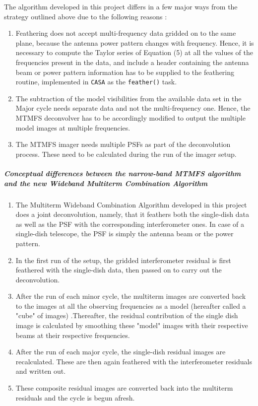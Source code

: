 \documentclass{article}
\begin{document}
The algorithm developed in this project differs in a few major ways from the strategy outlined above due to the following reasons : 
\begin{enumerate}
\item Feathering does not accept multi-frequency data gridded on to the same plane, because the antenna power pattern changes with frequency. Hence, it is necessary to compute the Taylor series of Equation (5) at all the values of the frequencies present in the data, and include a header containing the antenna beam or power pattern information has to be supplied to the feathering routine, implemented in \texttt{CASA} as the \texttt{feather()} task. 
\item The subtraction of the model visibilities from the available data set in the Major cycle needs separate data and not the multi-frequency one. Hence, the MTMFS deconvolver has to be accordingly modified to output the multiple model images at multiple frequencies. 
\item The MTMFS imager needs multiple PSFs as part of the deconvolution process. These need to be calculated during the run of the imager setup. 
\end{enumerate}
\subparagraph{Conceptual differences between the narrow-band MTMFS algorithm and the new Wideband Multiterm Combination Algorithm}
\begin{enumerate}
\item The Multiterm Wideband Combination Algorithm developed in this project does a joint deconvolution, namely, that it feathers both the single-dish data as well as the PSF with the corresponding interferometer ones. In case of a single-dish telescope, the PSF is simply the antenna beam or the power pattern.
\item In the first run of the setup, the gridded interferometer residual is first feathered with the single-dish data, then passed on to carry out the deconvolution.
\item After the run of each minor cycle, the multiterm images are converted back to the images at all the observing frequencies as a model (hereafter called a "cube" of images) .Thereafter, the residual contribution of the single dish image is calculated by smoothing these "model" images with their respective beams at their respective frequencies. 
\item After the run of each major cycle, the single-dish residual images are recalculated. These are then again feathered with the interferometer residuals and written out. 
\item These composite residual images are converted back into the multiterm residuals and the cycle is begun afresh.
\end{enumerate}
\end{document}
